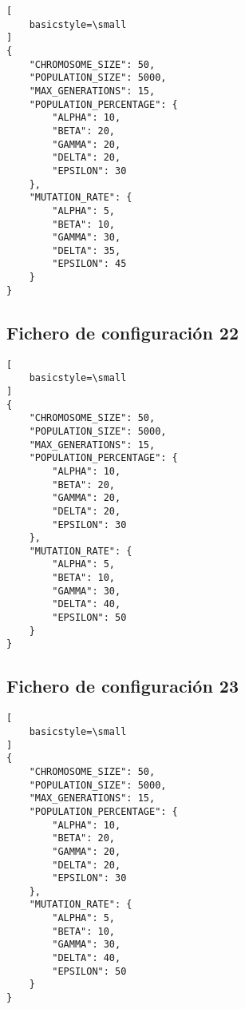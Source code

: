 \begin{lstlisting}[
    basicstyle=\small
]
{
    "CHROMOSOME_SIZE": 50,
    "POPULATION_SIZE": 5000,
    "MAX_GENERATIONS": 15,
    "POPULATION_PERCENTAGE": {
        "ALPHA": 10,
        "BETA": 20,
        "GAMMA": 20,
        "DELTA": 20,
        "EPSILON": 30
    },
    "MUTATION_RATE": {
        "ALPHA": 5,
        "BETA": 10,
        "GAMMA": 30,
        "DELTA": 35,
        "EPSILON": 45
    }
}
\end{lstlisting}

\subsection{Fichero de configuración 22} \label{subsect:config_file_22}

\begin{lstlisting}[
    basicstyle=\small
]
{
    "CHROMOSOME_SIZE": 50,
    "POPULATION_SIZE": 5000,
    "MAX_GENERATIONS": 15,
    "POPULATION_PERCENTAGE": {
        "ALPHA": 10,
        "BETA": 20,
        "GAMMA": 20,
        "DELTA": 20,
        "EPSILON": 30
    },
    "MUTATION_RATE": {
        "ALPHA": 5,
        "BETA": 10,
        "GAMMA": 30,
        "DELTA": 40,
        "EPSILON": 50
    }
}  
\end{lstlisting}

\subsection{Fichero de configuración 23} \label{subsect:config_file_23}

\begin{lstlisting}[
    basicstyle=\small
]
{
    "CHROMOSOME_SIZE": 50,
    "POPULATION_SIZE": 5000,
    "MAX_GENERATIONS": 15,
    "POPULATION_PERCENTAGE": {
        "ALPHA": 10,
        "BETA": 20,
        "GAMMA": 20,
        "DELTA": 20,
        "EPSILON": 30
    },
    "MUTATION_RATE": {
        "ALPHA": 5,
        "BETA": 10,
        "GAMMA": 30,
        "DELTA": 40,
        "EPSILON": 50
    }
}
   
\end{lstlisting}
